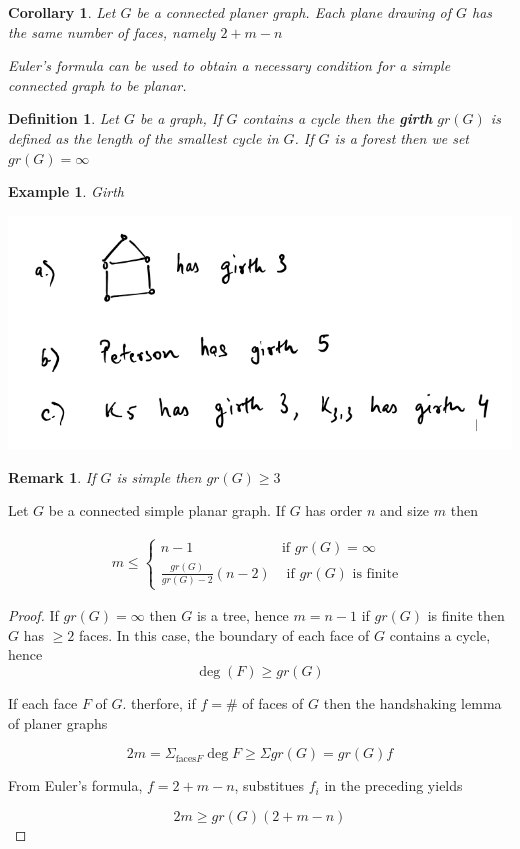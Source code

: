 \documentclass[12pt]{article}
\newenvironment{theorem}[1]{%
  \renewcommand\themanualtheoreminner{#1}%
  \manualtheoreminner
}{\endmanualtheoreminner}
\newtheorem*{corollary}{Corollary}
\newtheorem{example}{Example}
\newtheorem{definition}{Definition}
\newtheorem*{remark}{Remark}
\newenvironment{pro}{\begin{proof}}{\end{proof}}
\begin{document}
\begin{corollary}

	Let $G$ be a connected planer graph. Each plane drawing of $G$ has the same number of faces, namely $2+m - n$

	Euler's formula can be used to obtain a necessary condition for a simple connected graph to be planar.
\end{corollary}

\begin{definition}
	Let $G$ be a graph, If $G$ contains a cycle then the \textbf{girth} $gr(G)$ is defined as the length of the smallest cycle in $G$. If $G$ is a forest then we set $gr(G) = \infty$
\end{definition}

\begin{example}
	Girth
	\begin{center}
		\includegraphics[scale=0.5]{example}
	\end{center}
\end{example}


\begin{remark}
	If $G$ is simple then $gr(G) \ge 3$
\end{remark}


\begin{theorem}{4}
	Let $G$ be a connected simple planar graph. If $G$ has order $n$ and size $m$ then

	\begin{align} m \le \begin{cases} n-1                          & \text{if } gr(G) = \infty             \\
              \frac{gr(G)}{gr(G) - 2}(n-2) & \text{ if  } gr(G) \text{ is finite }\end{cases}
	\end{align}
\end{theorem}


\begin{pro}
	If $gr(G) = \infty$ then $G$ is a tree, hence $m = n-1$ if $gr(G)$ is finite then $G$ has $\ge 2$ faces. In this case, the boundary of each face of $G$ contains a cycle, hence
	\[\deg (F) \ge gr(G)\]

	If each face $F$ of $G$. therfore, if $f = \#$ of faces of $G$ then the handshaking lemma of planer graphs

	\[ 2m = \Sigma_{\text{faces} F} \deg F \ge \Sigma gr(G) = gr(G) f\]

	From Euler's formula, $f = 2+m-n$, substitues $f_{i}$ in the preceding yields

	\[2m \ge gr(G) (2+m-n)\]
\end{pro}
\end{document}
